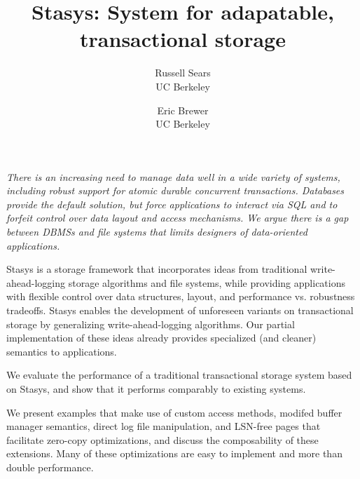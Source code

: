 \documentclass[letterpaper,twocolumn,10pt]{article}
\newcommand{\yad}{Stasys\xspace}
\begin{document}
\date{}


\title{\Large \bf \yad: System for adapatable, transactional storage}

\author{
{\rm Russell Sears}\\
UC Berkeley
\and
{\rm Eric Brewer}\\
UC Berkeley
} %

\maketitle




{\em There is an increasing need to manage data well in a wide variety of
systems, including robust support for atomic durable concurrent
transactions.  Databases provide the default solution, but force
applications to interact via SQL and to forfeit control over data
layout and access mechanisms.  We argue there is a gap between DBMSs and file systems that limits designers of data-oriented applications.

\yad is a storage framework that incorporates ideas from traditional
write-ahead-logging storage algorithms and file systems,
while providing applications with flexible control over data structures, layout, and performance vs. robustness tradeoffs.
\yad enables the development of
unforeseen variants on transactional storage by generalizing
write-ahead-logging algorithms.  Our partial implementation of these
ideas already provides specialized (and cleaner) semantics to applications.

We evaluate the performance of a traditional transactional storage
system based on \yad, and show that it performs comparably to existing
systems.  

We present examples that make use of custom access methods, modifed
buffer manager semantics, direct log file manipulation, and LSN-free
pages that facilitate zero-copy optimizations, and discuss the
composability of these extensions.  Many of these optimizations are
easy to implement and more than double performance.

}
\end{document}
